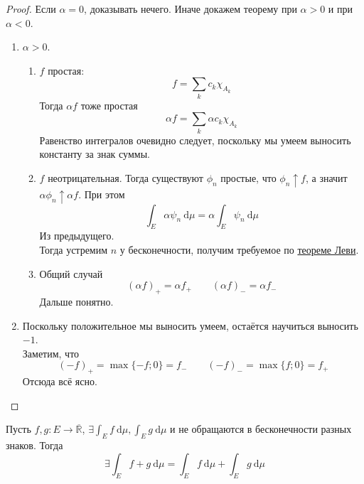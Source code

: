 \documentclass{article}
\begin{document}
    \begin{proof}
        Если $\alpha=0$, доказывать нечего. Иначе докажем теорему при $\alpha>0$ и при $\alpha<0$.
        \begin{enumerate}
            \item $\alpha>0$.
            \begin{enumerate}
                \item $f$ простая:
                $$
                f=\sum\limits_kc_k\chi_{A_k}
                $$
                Тогда $\alpha f$ тоже простая
                $$
                \alpha f=\sum\limits_k\alpha c_k\chi_{A_k}
                $$
                Равенство интегралов очевидно следует, поскольку мы умеем выносить константу за знак суммы.
                \item $f$ неотрицательная. Тогда существуют $\phi_n$ простые, что $\phi_n\uparrow f$, а значит $\alpha \phi_n\uparrow\alpha f$. При этом
                $$
                \int_E\alpha\psi_n~\mathrm d\mu=\alpha\int_E\psi_n~\mathrm d\mu
                $$
                Из предыдущего.\\
                Тогда устремим $n$ у бесконечности, получим требуемое по \hyperref[Теорема Леви]{теореме Леви}.
                \item Общий случай
                $$
                (\alpha f)_+=\alpha f_+\qquad (\alpha f)_-=\alpha f_-
                $$
                Дальше понятно.
            \end{enumerate}
            \item Поскольку положительное мы выносить умеем, остаётся научиться выносить $-1$.\\
            Заметим, что
            $$
            (-f)_+=\max\{-f;0\}=f_-\qquad (-f)_-=\max\{f;0\}=f_+
            $$
            Отсюда всё ясно.
        \end{enumerate}
    \end{proof}
    \begin{theorem}
        \label{Аддитивность интеграла по функции}
        Пусть $f,g\colon E\to\overline{\mathbb R}$, $\exists\int_E f~\mathrm d\mu,\int_E g~\mathrm d\mu$ и не обращаются в бесконечности разных знаков. Тогда
        $$
        \exists \int_E f+g~\mathrm d\mu=\int_E f~\mathrm d\mu+\int_E g~\mathrm d\mu
        $$
    \end{theorem}
\end{document}
